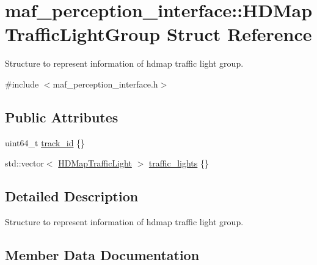 \hypertarget{structmaf__perception__interface_1_1HDMapTrafficLightGroup}{}\section{maf\+\_\+perception\+\_\+interface\+:\+:H\+D\+Map\+Traffic\+Light\+Group Struct Reference}
\label{structmaf__perception__interface_1_1HDMapTrafficLightGroup}


Structure to represent information of hdmap traffic light group.  




{\ttfamily \#include $<$maf\+\_\+perception\+\_\+interface.\+h$>$}

\subsection*{Public Attributes}
\begin{DoxyCompactItemize}
\item 
uint64\+\_\+t \hyperlink{structmaf__perception__interface_1_1HDMapTrafficLightGroup_af86b6686e000ce2fdc4f4f43f24d4895}{track\+\_\+id} \{\}
\item 
std\+::vector$<$ \hyperlink{structmaf__perception__interface_1_1HDMapTrafficLight}{H\+D\+Map\+Traffic\+Light} $>$ \hyperlink{structmaf__perception__interface_1_1HDMapTrafficLightGroup_a46ef7573cc767959861909548f2554ba}{traffic\+\_\+lights} \{\}
\end{DoxyCompactItemize}


\subsection{Detailed Description}
Structure to represent information of hdmap traffic light group. 

\subsection{Member Data Documentation}
\mbox{\label{structmaf__perception__interface_1_1HDMapTrafficLightGroup_af86b6686e000ce2fdc4f4f43f24d4895}} 
